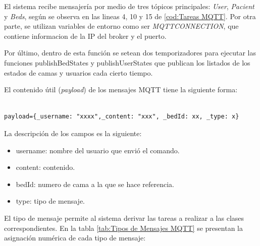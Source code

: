 El sistema recibe mensajería por medio de tres tópicos principales: \textit{User}, \textit{Pacient} y \textit{Beds}, según se observa en las lineas 4, 10 y 15 de \ref{cod:Tareas MQTT}. Por otra parte, se utilizan variables de entorno como ser \textit{MQTT\textunderscore CONNECTION}, que contiene informacion de la IP del broker y el puerto.

Por último, dentro de esta función se setean dos temporizadores para ejecutar las funciones publishBedStates y publishUserStates que publican los listados de los estados de camas y usuarios cada cierto tiempo.




El contenido útil (\textit{payload}) de los mensajes MQTT tiene la siguiente forma:

\begin{lstlisting}[label=cod:Mensaje MQTT,caption=  Formato mensaje MQTT]

payload={_username: "xxxx",_content: "xxx", _bedId: xx, _type: x}

\end{lstlisting}

La descripción de los campos es la siguiente:
\begin{itemize}
\item \textunderscore username: nombre del usuario que envió el comando.
\item \textunderscore content: contenido.
\item \textunderscore bedId: numero de cama a la que se hace referencia.
\item \textunderscore type: tipo de mensaje.
\end{itemize}

El tipo de mensaje permite al sistema derivar las tareas a realizar a las clases correspondientes. En la tabla \ref{tab:Tipos de Mensajes MQTT} se presentan la asignación numérica de cada tipo de mensaje:

